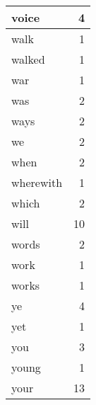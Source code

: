 \begin{center}
\begin{longtable}{l|r}
voice & 4 \\ \hline
walk & 1 \\ \hline
walked & 1 \\ \hline
war & 1 \\ \hline
was & 2 \\ \hline
ways & 2 \\ \hline
we & 2 \\ \hline
when & 2 \\ \hline
wherewith & 1 \\ \hline
which & 2 \\ \hline
will & 10 \\ \hline
words & 2 \\ \hline
work & 1 \\ \hline
works & 1 \\ \hline
ye & 4 \\ \hline
yet & 1 \\ \hline
you & 3 \\ \hline
young & 1 \\ \hline
your & 13 \\ \hline
\end{longtable}
\end{center}



\normalsize



